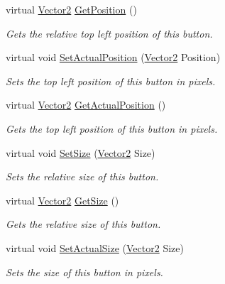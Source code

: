 \begin{DoxyCompactItemize}
virtual \hyperlink{classphys_1_1Vector2}{Vector2} \hyperlink{classphys_1_1UI_1_1Button_adfa08ace813b88cae114e18f88942642}{GetPosition} ()
\begin{DoxyCompactList}\small\item\em Gets the relative top left position of this button. \item\end{DoxyCompactList}\item 
virtual void \hyperlink{classphys_1_1UI_1_1Button_a90ef37a2fa1645298237733918455814}{SetActualPosition} (\hyperlink{classphys_1_1Vector2}{Vector2} Position)
\begin{DoxyCompactList}\small\item\em Sets the top left position of this button in pixels. \item\end{DoxyCompactList}\item 
virtual \hyperlink{classphys_1_1Vector2}{Vector2} \hyperlink{classphys_1_1UI_1_1Button_a0b991ada87707d8d951dae7c0e3246f6}{GetActualPosition} ()
\begin{DoxyCompactList}\small\item\em Gets the top left position of this button in pixels. \item\end{DoxyCompactList}\item 
virtual void \hyperlink{classphys_1_1UI_1_1Button_a3f610782e5f84ddc315d9db6ef5f9109}{SetSize} (\hyperlink{classphys_1_1Vector2}{Vector2} Size)
\begin{DoxyCompactList}\small\item\em Sets the relative size of this button. \item\end{DoxyCompactList}\item 
virtual \hyperlink{classphys_1_1Vector2}{Vector2} \hyperlink{classphys_1_1UI_1_1Button_ade75e042d1a19be5d4fb1b16913af5a5}{GetSize} ()
\begin{DoxyCompactList}\small\item\em Gets the relative size of this button. \item\end{DoxyCompactList}\item 
virtual void \hyperlink{classphys_1_1UI_1_1Button_a4075f879a67726b80c18d3bc647e12fe}{SetActualSize} (\hyperlink{classphys_1_1Vector2}{Vector2} Size)
\begin{DoxyCompactList}\small\item\em Sets the size of this button in pixels. \item\end{DoxyCompactList}\item 

\end{DoxyCompactItemize}
